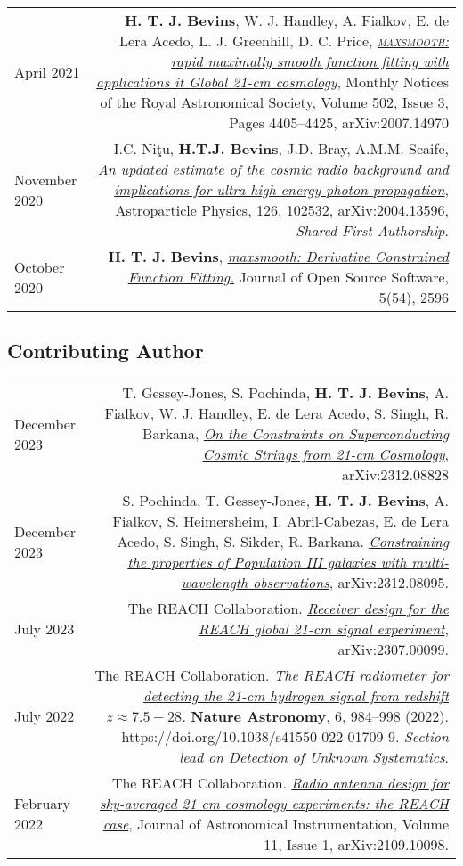 \documentclass{article}
\begin{document}
\begin{tabular}{L!{\vrule}R}
	April 2021 & \textbf{H. T. J. Bevins}, W. J. Handley, A. Fialkov, E. de Lera Acedo, L. J. Greenhill, D. C. Price, \href{https://academic.oup.com/mnras/article/502/3/4405/6105349?guestAccessKey=769d7461-cc0b-4d83-9cdf-bc351056d911}{\textit{\textsc{maxsmooth}: rapid maximally smooth function fitting with applications it Global 21-cm cosmology}}, Monthly Notices of the Royal Astronomical Society, Volume 502, Issue 3, Pages 4405–4425, 
    arXiv:2007.14970\\
	November 2020 & I.C. Ni\c{t}u, \textbf{H.T.J. Bevins}, J.D. Bray, A.M.M. Scaife, \href{https://www.sciencedirect.com/science/article/pii/S0927650520301043?via\%3Dihub}{\textit{An updated estimate of the cosmic radio background and implications for ultra-high-energy photon propagation}}, Astroparticle Physics, 126, 102532, arXiv:2004.13596, \textit{Shared First Authorship}. \\
	October 2020 & \textbf{H. T. J. Bevins}, \href{https://joss.theoj.org/papers/10.21105/joss.02596}{\textit{maxsmooth: Derivative Constrained Function Fitting.}} Journal of Open Source Software, 5(54), 2596 \\
\end{tabular}

\subsection*{Contributing Author}

\begin{tabular}{L!{\vrule}R}
    December 2023 & T. Gessey-Jones, S. Pochinda, \textbf{H. T. J. Bevins}, A. Fialkov, W. J. Handley, E. de Lera Acedo, S. Singh, R. Barkana, \href{https://arxiv.org/abs/2312.08828}{\textit{On the Constraints on Superconducting Cosmic Strings from 21-cm Cosmology}}, arXiv:2312.08828 \\
    December 2023 & S. Pochinda, T. Gessey-Jones, \textbf{H. T. J. Bevins}, A. Fialkov, S. Heimersheim, I. Abril-Cabezas, E. de Lera Acedo, S. Singh, S. Sikder, R. Barkana. \href{https://arxiv.org/abs/2312.08095}{\textit{Constraining the properties of Population III galaxies with multi-wavelength observations}}, arXiv:2312.08095. \\
    July 2023 & The REACH Collaboration. \href{https://arxiv.org/abs/2307.00099}{\textit{Receiver design for the REACH global 21-cm signal experiment}}, arXiv:2307.00099. \\
	July 2022 & The REACH Collaboration. \href{https://www.nature.com/articles/s41550-022-01709-9?utm_campaign=related_content&utm_source=ASTRO&utm_medium=communities}{\textit{The REACH radiometer for detecting the 21-cm hydrogen signal from redshift $z \approx 7.5 -28$.}} \textbf{Nature Astronomy}, 6, 984–998 (2022). https://doi.org/10.1038/s41550-022-01709-9. \textit{Section lead on Detection of Unknown Systematics}. \\
	February 2022 & The REACH Collaboration. \href{https://ui.adsabs.harvard.edu/abs/2021arXiv210910098C/abstract}{\textit{Radio antenna design for sky-averaged 21 cm cosmology experiments: the REACH case}}, Journal of Astronomical Instrumentation, Volume 11, Issue 1, arXiv:2109.10098. \\
\end{tabular}
\end{document}
